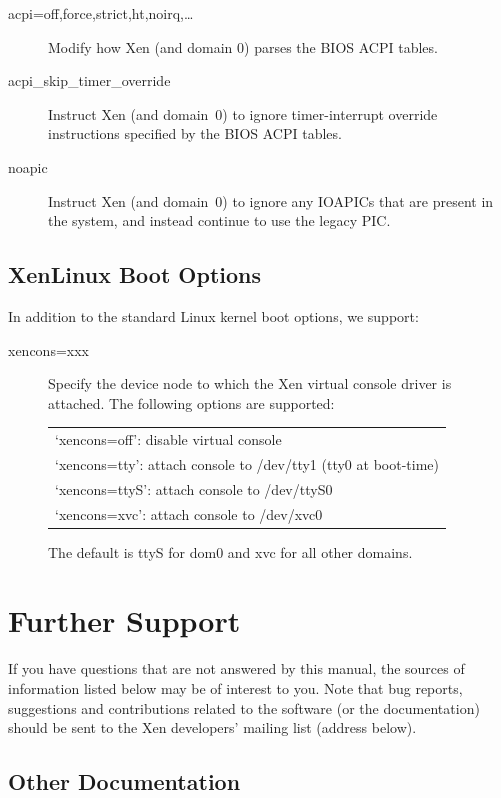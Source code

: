 \documentclass[11pt,twoside,final,openright]{report}
\begin{document}
\begin{description}
\item [ acpi=off,force,strict,ht,noirq,\ldots ] Modify how Xen (and
  domain 0) parses the BIOS ACPI tables.
\item [ acpi\_skip\_timer\_override ] Instruct Xen (and domain~0) to
  ignore timer-interrupt override instructions specified by the BIOS
  ACPI tables.
\item [ noapic ] Instruct Xen (and domain~0) to ignore any IOAPICs
  that are present in the system, and instead continue to use the
  legacy PIC.
\end{description} 


\section{XenLinux Boot Options}

In addition to the standard Linux kernel boot options, we support:
\begin{description}
\item[ xencons=xxx ] Specify the device node to which the Xen virtual
  console driver is attached. The following options are supported:
  \begin{center}
    \begin{tabular}{l}
      `xencons=off': disable virtual console \\
      `xencons=tty': attach console to /dev/tty1 (tty0 at boot-time) \\
      `xencons=ttyS': attach console to /dev/ttyS0 \\
      `xencons=xvc': attach console to /dev/xvc0
    \end{tabular}
\end{center}
The default is ttyS for dom0 and xvc for all other domains.
\end{description}


\chapter{Further Support}

If you have questions that are not answered by this manual, the
sources of information listed below may be of interest to you.  Note
that bug reports, suggestions and contributions related to the
software (or the documentation) should be sent to the Xen developers'
mailing list (address below).


\section{Other Documentation}
\end{document}
